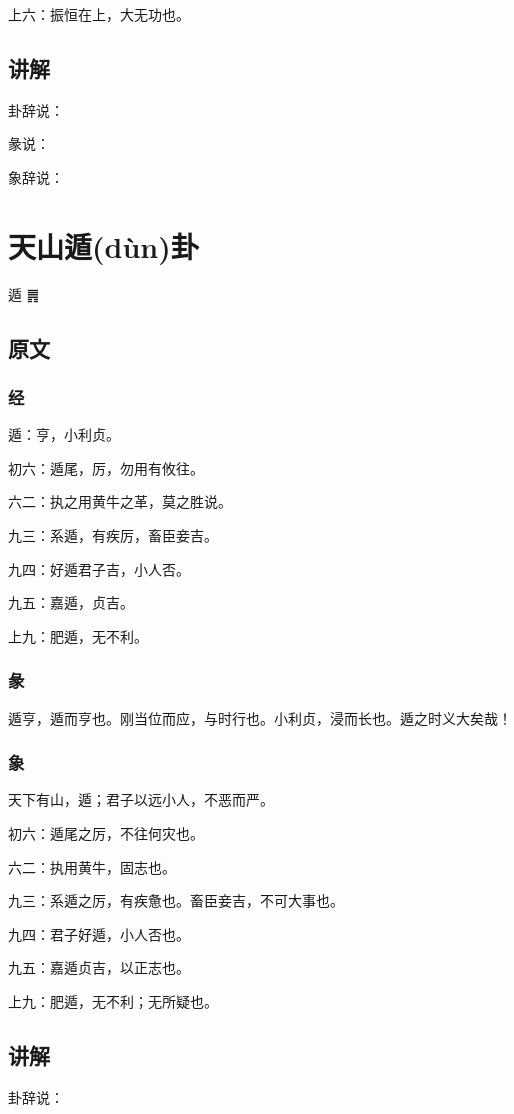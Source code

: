 \documentclass[12pt,oneside]{book}
\begin{document}
上六：振恒在上，大无功也。

\section{讲解}
卦辞说：

彖说：

象辞说：

\chapter{天山遁(dùn)卦}
遁 {\Large ䷠}

\section{原文}

\subsection{经}
遁：亨，小利贞。

初六：遁尾，厉，勿用有攸往。

六二：执之用黄牛之革，莫之胜说。

九三：系遁，有疾厉，畜臣妾吉。

九四：好遁君子吉，小人否。

九五：嘉遁，贞吉。

上九：肥遁，无不利。

\subsection{彖}
遁亨，遁而亨也。刚当位而应，与时行也。小利贞，浸而长也。遁之时义大矣哉！

\subsection{象}
天下有山，遁；君子以远小人，不恶而严。

初六：遁尾之厉，不往何灾也。

六二：执用黄牛，固志也。

九三：系遁之厉，有疾惫也。畜臣妾吉，不可大事也。

九四：君子好遁，小人否也。

九五：嘉遁贞吉，以正志也。

上九：肥遁，无不利；无所疑也。

\section{讲解}
卦辞说：
\end{document}
